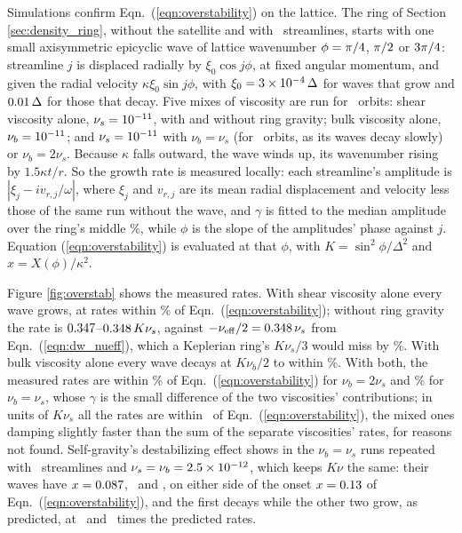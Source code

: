 \documentclass[twocolumn]{aastex702}
\begin{document}
Simulations confirm Eqn.\ (\ref{eqn:overstability}) on the lattice. The ring of Section \ref{sec:density_ring},
without the satellite and with \osNstreamlines\ streamlines, starts with one small axisymmetric epicyclic wave of
lattice wavenumber $\phi = \pi/4$, $\pi/2$ or $3\pi/4$: streamline $j$ is displaced radially by $\xi_0\cos j\phi$, at
fixed angular momentum, and given the radial velocity $\kappa\xi_0\sin j\phi$, with $\xi_0 = 3\times10^{-4}\,\Delta$ for
waves that grow and $0.01\,\Delta$ for those that decay. Five mixes of viscosity are run for \osOrbits\ orbits:
shear viscosity alone, $\nu_s = 10^{-11}$, with and without ring gravity; bulk viscosity alone, $\nu_b = 10^{-11}$; and
$\nu_s = 10^{-11}$ with $\nu_b = \nu_s$ (for \osOrbitsLong\ orbits, as its waves decay slowly) or $\nu_b = 2\nu_s$.
Because $\kappa$ falls outward, the wave winds up, its wavenumber rising by $1.5\kappa t/r$. So the growth rate is
measured locally: each streamline's amplitude is $|\xi_j - iv_{r,j}/\omega|$, where $\xi_j$ and $v_{r,j}$ are its mean
radial displacement and velocity less those of the same run without the wave, and $\gamma$ is fitted to the median
amplitude over the ring's middle \osWindowPercent\%, while $\phi$ is the slope of the amplitudes' phase against $j$.
Equation (\ref{eqn:overstability}) is evaluated at that $\phi$, with $K = \sin^2\phi/\Delta^2$ and $x = X(\phi)/\kappa^2$.

Figure \ref{fig:overstab} shows the measured rates. With shear viscosity alone every wave grows, at rates within
\osShearPercent\% of Eqn.\ (\ref{eqn:overstability}); without ring gravity the rate is $0.347$--$0.348\,K\nu_s$,
against $-\nu_{\rm eff}/2 = 0.348\,\nu_s$ from Eqn.\ (\ref{eqn:dw_nueff}), which a Keplerian ring's $K\nu_s/3$
would miss by \osKeplerPercent\%. With bulk viscosity alone every wave decays at $K\nu_b/2$ to within \osBulkPercent\%.
With both, the measured rates are within \osDPercent\% of Eqn.\ (\ref{eqn:overstability}) for $\nu_b = 2\nu_s$ and
\osAPercent\% for $\nu_b = \nu_s$, whose $\gamma$ is the small difference of the two viscosities' contributions; in
units of $K\nu_s$ all the rates are within \osMaxDiff\ of Eqn.\ (\ref{eqn:overstability}), the mixed ones damping
slightly faster than the sum of the separate viscosities' rates, for reasons not found. Self-gravity's destabilizing
effect shows in the $\nu_b = \nu_s$ runs repeated with \osNstreamlinesHigh\ streamlines and $\nu_s = \nu_b =
2.5\times10^{-12}$, which keeps $K\nu$ the same: their waves have $x = 0.087$, \osAHxTwo\ and \osAHxThree, on either side
of the onset $x = 0.13$ of Eqn.\ (\ref{eqn:overstability}), and the first decays while the other two grow, as
predicted, at \osAHRatioTwo\ and \osAHRatioThree\ times the predicted rates.
\end{document}

